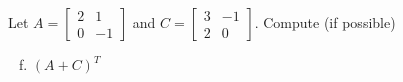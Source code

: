 \documentclass[../main.tex]{subfiles}
\begin{document}
Let
$A = \left[\begin{array}{rr}
	2 & 1 \\
	0 & -1
\end{array}\right]$
and
$C = \left[\begin{array}{rr}
	3 & -1 \\
	2 & 0
\end{array}\right]$.
Compute (if possible)
\begin{enumerate}[a)]
	\setcounter{enumi}{5}
	\item $(A + C)^T$
\end{enumerate}
\end{document}
